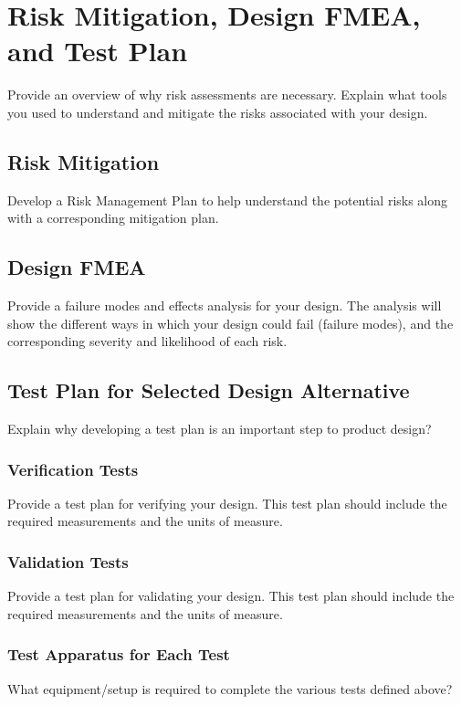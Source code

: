 \documentclass{other/docTemplate}
\begin{document}
\section{Risk Mitigation, Design FMEA, and Test Plan}
Provide an overview of why risk assessments are necessary. Explain what tools you used to understand and mitigate the risks associated with your design.

\subsection{Risk Mitigation}
Develop a Risk Management Plan to help understand the potential risks along with a corresponding mitigation plan.


\subsection{Design FMEA}
Provide a failure modes and effects analysis for your design. The analysis will show the different ways in which your design could fail (failure modes), and the corresponding severity and likelihood of each risk. 

\subsection{Test Plan for Selected Design Alternative}
Explain why developing a test plan is an important step to product design? 



\subsubsection{Verification Tests}
Provide a test plan for verifying your design.
This test plan should include the required measurements and the units of measure.

\subsubsection{Validation Tests}
Provide a test plan for validating your design.
This test plan should include the required measurements and the units of measure.

\subsubsection{Test Apparatus for Each Test}
What equipment/setup is required to complete the various tests defined above? 
\end{document}
